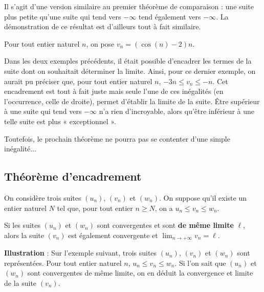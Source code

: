 \documentclass[11pt,fleqn, openany]{book} %
\begin{document}
Il s'agit d'une version similaire au premier théorème de comparaison : une suite plus petite qu'une suite qui tend vers $-\infty$ tend également vers $-\infty$. La démonstration de ce résultat est d'ailleurs tout à fait similaire.

\begin{example}Pour tout entier naturel $n$, on pose $v_n=(\cos(n)-2)n$.

\vskip30pt \end{example}

Dans les deux exemples précédents, il était possible d'encadrer les termes de la suite dont on souhaitait déterminer la limite. Ainsi, pour ce dernier exemple, on aurait pu préciser que, pour tout entier naturel $n$, $-3n \leqslant v_n \leqslant -n$. Cet encadrement est tout à fait juste mais seule l'une de ces inégalités (en l'occurrence, celle de droite), permet d'établir la limite de la suite. Être supérieur à une suite qui tend vers $-\infty$ n'a rien d'incroyable, alors qu'être inférieur à une telle suite est plus « exceptionnel ».

Toutefois, le prochain théorème ne pourra pas se contenter d'une simple inégalité...

\subsection{Théorème d'encadrement}

\begin{theorem}On considère trois suites $(u_n)$, $(v_n)$ et $(w_n)$. On suppose qu'il existe un entier naturel $N$ tel que, pour tout entier $n\geqslant N$, on a $u_n \leqslant v_n \leqslant w_n$.

Si les suites $(u_n)$ et $(w_n)$ sont convergentes et sont \textbf{de même limite} $\ell$, alors la suite $(v_n)$ est également convergente et $\displaystyle\lim_{n\to+\infty}v_n=\ell$.\end{theorem}



\textbf{Illustration} : Sur l'exemple suivant, trois suites $(u_n)$, $(v_n)$ et $(w_n)$ sont représentées. Pour tout entier naturel $n$, $u_n \leqslant v_n \leqslant w_n$. Si l'on sait que $(u_n)$ et $(w_n)$ sont convergentes de même limite, on en déduit la convergence et limite de la suite $(v_n)$.
\end{document}
